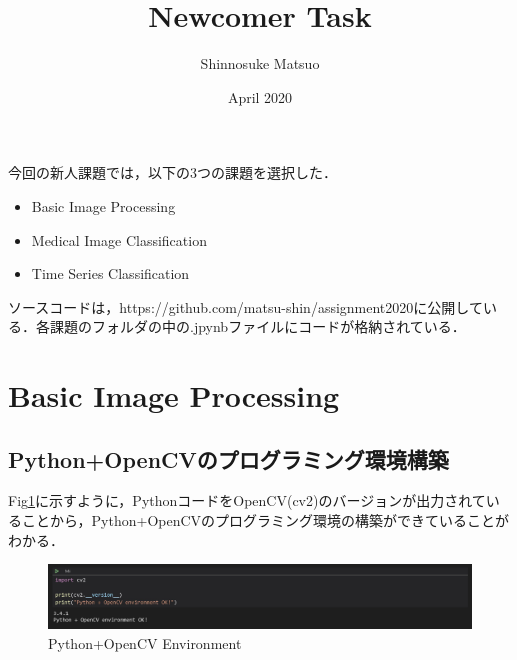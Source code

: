 \documentclass[11pt,a4j]{jarticle}
\title{Newcomer Task}
\author{Shinnosuke Matsuo}
\date{April 2020}
\begin{document}
\maketitle
今回の新人課題では，以下の3つの課題を選択した．
\begin{itemize}
  \item Basic Image Processing
  \item Medical Image Classification
  \item Time Series Classification
\end{itemize}

ソースコードは，https://github.com/matsu-shin/assignment2020に公開している．各課題のフォルダの中の.jpynbファイルにコードが格納されている．

\section{Basic Image Processing}

\subsection{Python+OpenCVのプログラミング環境構築}
Fig\ref{output_0}に示すように，PythonコードをOpenCV(cv2)のバージョンが出力されていることから，Python+OpenCVのプログラミング環境の構築ができていることがわかる．
\begin{figure}[ht]
	\centering
	\includegraphics[width=\linewidth]{../1_BasicImageProcessing/output/output_0.jpg}
	\renewcommand{\figurename}{Fig}
	\caption{Python+OpenCV Environment}
	\vspace{1cm}
	\label{output_0}
\end{figure}
\end{document}
